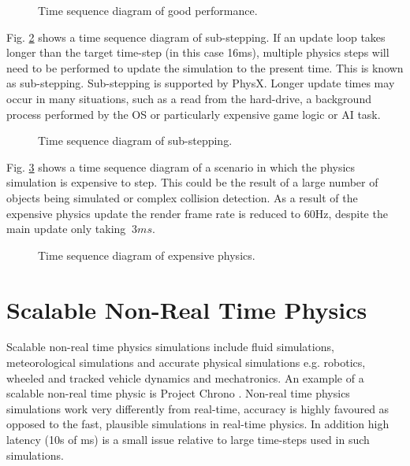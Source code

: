 \begin{figure}
	\centering
	
	\caption{Time sequence diagram of good performance.}
	\label{GoodPerf}
\end{figure}

Fig. \ref{SubStep} shows a time sequence diagram of sub-stepping. If an update loop takes longer than the target time-step (in this case 16ms), multiple physics steps will need to be performed to update the simulation to the present time. This is known as sub-stepping. Sub-stepping is supported by PhysX. Longer update times may occur in many situations, such as a read from the hard-drive, a background process performed by the OS or particularly expensive game logic or AI task.

\begin{figure}
	\centering
	
	\caption{Time sequence diagram of sub-stepping.}
	\label{SubStep}
\end{figure}

Fig. \ref{ExpensivePhysics} shows a time sequence diagram of a scenario in which the physics simulation is expensive to step. This could be the result of a large number of objects being simulated or complex collision detection. As a result of the expensive physics update the render frame rate is reduced to 60Hz, despite the main update only taking $~3ms$.

\begin{figure}
	\centering
	
	\caption{Time sequence diagram of expensive physics.}
	\label{ExpensivePhysics}
\end{figure}

%
%	

\section{Scalable Non-Real Time Physics}
Scalable non-real time physics simulations include fluid simulations, meteorological simulations and accurate physical simulations e.g. robotics, wheeled and tracked vehicle dynamics and mechatronics. An example of a scalable non-real time physic is Project Chrono \cite{Chrono}. Non-real time physics simulations work very differently from real-time, accuracy is highly favoured as opposed to the fast, plausible simulations in real-time physics. In addition high latency (10s of ms) is a small issue relative to large time-steps used in such simulations.


